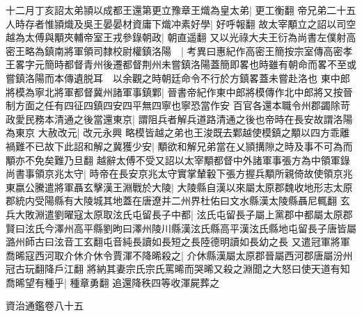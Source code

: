 十二月丁亥詔太弟頴以成都王還第更立豫章王熾為皇太弟|{
	更工衡翻}
帝兄弟二十五人時存者惟頴熾及吳王晏晏材資庸下熾冲素好學|{
	好呼報翻}
故太宰顒立之詔以司空越為太傅與顒夾輔帝室王戎參錄朝政|{
	朝直遥翻}
又以光祿大夫王衍為尚書左僕射高密王略為鎮南將軍領司隸校尉權鎮洛陽　|{
	考異曰惠紀作高密王簡按宗室傳高密孝王畧字元簡時都督青州後遷都督荆州未嘗鎮洛陽蓋簡即畧也時雖有朝命而畧不至或嘗鎮洛陽而本傳遺脱耳　以余觀之時朝廷命令不行於方鎮畧蓋未嘗赴洛也}
東中郎將模為寧北將軍都督冀州諸軍事鎮鄴|{
	晉書帝紀作東中郎將模傳作北中郎將又按晉制方面之任有四征四鎮四安四平無四寧也寧恐當作安}
百官各還本職令州郡蠲除苛政愛民務本清通之後當還東京|{
	謂阻兵者解兵道路清通之後也帝時在長安故謂洛陽為東京}
大赦改元|{
	改元永興}
略模皆越之弟也王浚既去鄴越使模鎮之顒以四方乖離禍難不已故下此詔和解之冀獲少安|{
	顒欲和解兄弟當在乂頴搆隙之時及事不可為而顒亦不免矣難乃旦翻}
越辭太傅不受又詔以太宰顒都督中外諸軍事張方為中領軍錄尚書事領京兆太守|{
	時帝在長安京兆太守實掌輦轂下張方握兵顒所親倚故使領京兆}
東嬴公騰遣將軍聶玄擊漢王淵戰於大陵|{
	大陵縣自漢以來屬太原郡魏收地形志太原郡統内受陽縣有大陵城其地蓋在唐遼并二州界杜佑曰文水縣漢太陵縣聶尼輒翻}
玄兵大敗淵遣劉曜寇太原取泫氏屯留長子中都|{
	泫氏屯留長子屬上黨郡中都屬太原郡賢曰泫氏今澤州高平縣劉昫曰澤州陵川縣漢泫氏縣高平漢泫氏縣地屯留長子唐皆屬潞州師古曰泫音工玄翻屯音純長讀如長短之長陸德明讀如長幼之長}
又遣冠軍將軍喬晞寇西河取介休介休令賈渾不降晞殺之|{
	介休縣漢屬太原郡晉屬西河郡唐屬汾州冠古玩翻降戶江翻}
將納其妻宗氏宗氏罵晞而哭晞又殺之淵聞之大怒曰使天道有知喬晞望有種乎|{
	種章勇翻}
追還降秩四等收渾屍葬之

資治通鑑卷八十五
